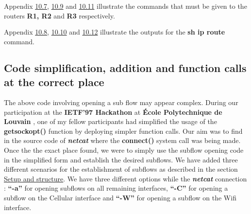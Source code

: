 \documentclass[a4paper,11pt]{article}
\begin{document}
			Appendix \hyperref[subsec:routerconf1]{10.7}, \hyperref[subsec:routerconf2]{10.9} and \hyperref[subsec:routerconf3]{10.11} illustrate the commands that must be given to the routers \textbf{R1, R2} and \textbf{R3} respectively.


			Appendix \hyperref[subsec:routerconfout1]{10.8}, \hyperref[subsec:routerconfout2]{10.10} and \hyperref[subsec:routerconfout3]{10.12} illustrate the outputs for the \textbf{sh ip route} command.

		\subsection{Code simplification, addition and function calls at the correct place}
			\label{subsec:codesimplify}
			The above code involving opening a sub flow may appear complex. During our participation at the \textbf{IETF'97 Hackathon} at \textbf{École Polytechnique de Louvain} \cite[hackathon]{ucl}, one of my fellow participants had simplified the usage of the \textbf{getsockopt()} function by deploying simpler function calls. Our aim was to find in the source code of \textbf{\emph{netcat}} where the \textbf{connect()} system call was being made. Once the the exact place found, we were to simply use the subflow opening code in the simplified form and establish the desired subflows. We have added three different scenarios for the establishment of subflows as described in the section \hyperref[subsec:setup]{Setup and structure}. We have three different options while the \textbf{\emph{netcat}} connection : \textbf{``-a''} for opening subflows on all remaining interfaces, \textbf{``-C''} for opening a subflow on the Cellular interface and \textbf{``-W''} for opening a subflow on the Wifi interface.
\end{document}
